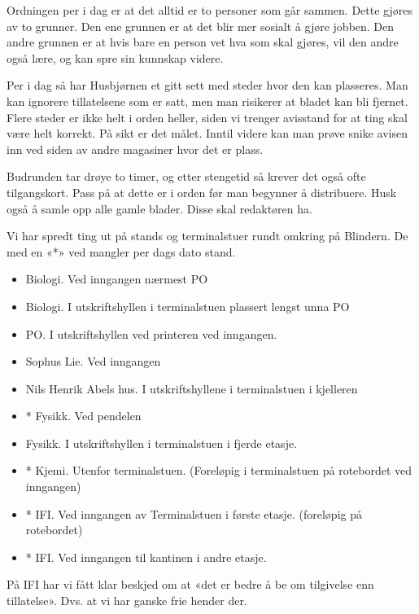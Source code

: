  Ordningen per i dag er at det alltid er to personer som går sammen.
Dette gjøres av to grunner. Den ene grunnen er at det blir mer sosialt
å gjøre jobben. Den andre grunnen er at hvis bare en person vet hva
som skal gjøres, vil den andre også lære, og kan spre sin kunnskap
videre.

 Per i dag så har Husbjørnen et gitt sett med steder hvor den kan
plasseres. Man kan ignorere tillatelsene som er satt, men man
risikerer at bladet kan bli fjernet. Flere steder er ikke helt i orden
heller, siden vi trenger avisstand for at ting skal være helt korrekt.
På sikt er det målet. Inntil videre kan man prøve snike avisen inn ved
siden av andre magasiner hvor det er plass.

 Budrunden tar drøye to timer, og etter stengetid så krever det også
ofte tilgangskort. Pass på at dette er i orden før man begynner å
distribuere. Husk også å samle opp alle gamle blader. Disse skal
redaktøren ha.

 Vi har spredt ting ut på stands og terminalstuer rundt omkring på
Blindern. De med en «*» ved mangler per dags dato stand.

\begin{itemize}
 \item Biologi. Ved inngangen nærmest PO
 \item Biologi. I utskriftshyllen i terminalstuen plassert lengst unna PO
 \item PO. I utskriftshyllen ved printeren ved inngangen.
 \item Sophus Lie. Ved inngangen
 \item Nils Henrik Abels hus. I utskriftshyllene i terminalstuen i kjelleren
 \item * Fysikk. Ved pendelen
 \item Fysikk. I utskriftshyllen i terminalstuen i fjerde etasje.
 \item * Kjemi. Utenfor terminalstuen. (Foreløpig i terminalstuen på
rotebordet ved inngangen)
 \item * IFI. Ved inngangen av Terminalstuen i første etasje. (foreløpig
på rotebordet)
 \item * IFI. Ved inngangen til kantinen i andre etasje.
\end{itemize}

 På IFI har vi fått klar beskjed om at «det er bedre å be om
tilgivelse enn tillatelse». Dvs. at vi har ganske frie hender der.

